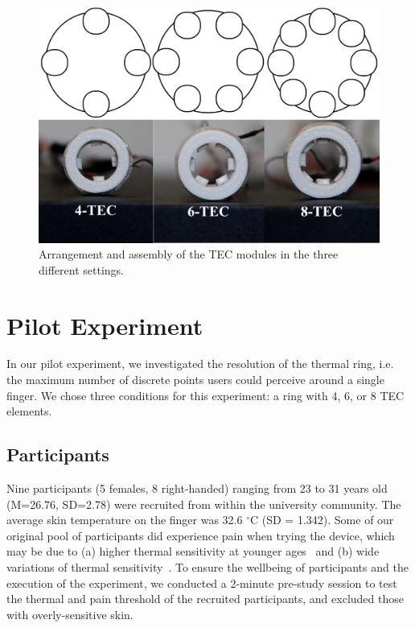 \documentclass[preprint,12pt]{elsarticle}
\begin{document}
\begin{figure}[h]
  \centering
  \includegraphics[width=0.8\columnwidth]{img/fig4.png}
  \caption{Arrangement and assembly of the TEC modules in the three different settings.}
  \label{fig:4}
\end{figure}

\section{Pilot Experiment}
In our pilot experiment, we investigated the resolution of the thermal ring, i.e. the maximum number of discrete points users could perceive around a single finger. We chose three conditions for this experiment: a ring with 4, 6, or 8 TEC elements.

\subsection{Participants}
Nine participants (5 females, 8 right-handed) ranging from 23 to 31 years old (M=26.76, SD=2.78) were recruited from within the university community. The average skin temperature on the finger was 32.6 $^{\circ}$C (SD = 1.342).
Some of our original pool of participants did experience pain when trying the device, which may be due to (a) higher thermal sensitivity at younger ages~\cite{31} and (b) wide variations of thermal sensitivity~\cite{31}.
To ensure the wellbeing of participants and the execution of the experiment, we conducted a 2-minute pre-study session to test the thermal and pain threshold of the recruited participants, and excluded those with overly-sensitive skin.
\end{document}

